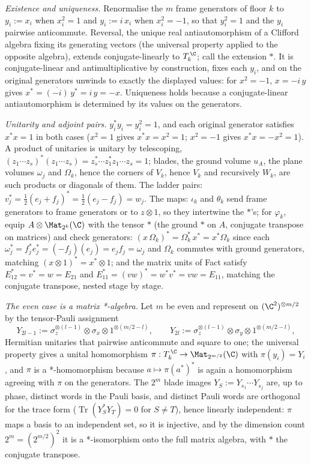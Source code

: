 \emph{Existence and uniqueness.} Renormalise the $m$ frame generators of floor $k$ to $y_i := x_i$ when $x_i^2 = 1$ and $y_i := i\,x_i$ when $x_i^2 = -1$, so that $y_i^2 = 1$ and the $y_i$ pairwise anticommute. Reversal, the unique real antiautomorphism of a Clifford algebra fixing its generating vectors (the universal property applied to the opposite algebra), extends conjugate-linearly to $T_k^{\,\C}$; call the extension $*$. It is conjugate-linear and antimultiplicative by construction, fixes each $y_i$, and on the original generators unwinds to exactly the displayed values: for $x^2 = -1$, $x = -i\,y$ gives $x^* = \overline{(-i)}\, y^* = i\,y = -x$. Uniqueness holds because a conjugate-linear antiautomorphism is determined by its values on the generators.

\emph{Unitarity and adjoint pairs.} $y_i^* y_i = y_i^2 = 1$, and each original generator satisfies $x^* x = 1$ in both cases ($x^2 = 1$ gives $x^*x = x^2 = 1$; $x^2 = -1$ gives $x^*x = -x^2 = 1$). A product of unitaries is unitary by telescoping, $(z_1 \cdots z_s)^* (z_1 \cdots z_s) = z_s^* \cdots z_1^* z_1 \cdots z_s = 1$; blades, the ground volume $u_A$, the plane volumes $\omega_j$ and $\Omega_k$, hence the corners of $V_k$, hence $V_k$ and recursively $W_k$, are such products or diagonals of them. The ladder pairs: $v_j^* = \tfrac12(e_j + f_j)^* = \tfrac12(e_j - f_j) = w_j$. The maps: $\iota_k$ and $\theta_k$ send frame generators to frame generators or to $z \otimes 1$, so they intertwine the $*$'s; for $\varphi_k$, equip $A \otimes \Mat_{2^k}(\C)$ with the tensor $*$ (the ground $*$ on $A$, conjugate transpose on matrices) and check generators: $(x\,\Omega_k)^* = \Omega_k^*\, x^* = x^* \Omega_k$ since each $\omega_j^* = f_j^* e_j^* = (-f_j)(e_j) = e_j f_j = \omega_j$ and $\Omega_k$ commutes with ground generators, matching $(x \otimes 1)^* = x^* \otimes 1$; and the matrix units of Fact  satisfy $E_{12}^* = v^* = w = E_{21}$ and $E_{11}^* = (vw)^* = w^* v^* = vw = E_{11}$, matching the conjugate transpose, nested stage by stage.

\emph{The even case is a matrix *-algebra.} Let $m$ be even and represent on $(\C^2)^{\otimes m/2}$ by the tensor-Pauli assignment
\[
Y_{2l-1} := \sigma_z^{\otimes (l-1)} \otimes \sigma_x \otimes 1^{\otimes (m/2 - l)}, \qquad
Y_{2l} := \sigma_z^{\otimes (l-1)} \otimes \sigma_y \otimes 1^{\otimes (m/2 - l)} ,
\]
Hermitian unitaries that pairwise anticommute and square to one; the universal property gives a unital homomorphism $\pi : T_k^{\,\C} \to \Mat_{2^{m/2}}(\C)$ with $\pi(y_i) = Y_i$, and $\pi$ is a *-homomorphism because $a \mapsto \pi(a^*)^*$ is again a homomorphism agreeing with $\pi$ on the generators. The $2^m$ blade images $Y_S := Y_{s_1} \cdots Y_{s_j}$ are, up to phase, distinct words in the Pauli basis, and distinct Pauli words are orthogonal for the trace form ($\operatorname{Tr}(Y_S^* Y_T) = 0$ for $S \neq T$), hence linearly independent: $\pi$ maps a basis to an independent set, so it is injective, and by the dimension count $2^m = (2^{m/2})^2$ it is a *-isomorphism onto the full matrix algebra, with $*$ the conjugate transpose.

